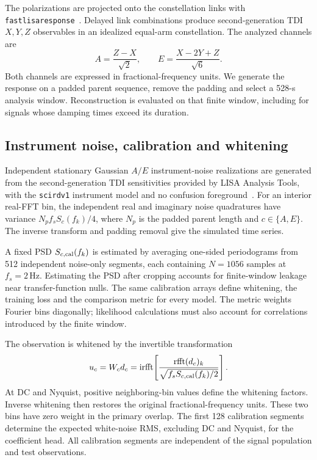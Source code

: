 \documentclass[10pt,prd,aps,a4paper,twocolumn,superscriptaddress,nofootinbib,floatfix]{revtex4-2}
\begin{document}
The polarizations are projected onto the constellation links with \texttt{fastlisaresponse}~\cite{Katz2022Response}. Delayed link combinations produce second-generation TDI $X,Y,Z$ observables in an idealized equal-arm constellation. The analyzed channels are
\begin{equation}
A=\frac{Z-X}{\sqrt{2}},\qquad E=\frac{X-2Y+Z}{\sqrt{6}}.\label{eq:aet_convention}
\end{equation}
Both channels are expressed in fractional-frequency units. We generate the response on a padded parent sequence, remove the padding and select a 528-s analysis window. Reconstruction is evaluated on that finite window, including for signals whose damping times exceed its duration.

\subsection{Instrument noise, calibration and whitening}\label{noise model}
Independent stationary Gaussian $A/E$ instrument-noise realizations are generated from the second-generation TDI sensitivities provided by LISA Analysis Tools, with the \texttt{scirdv1} instrument model and no confusion foreground~\cite{LISAAnalysisTools}. For an interior real-FFT bin, the independent real and imaginary noise quadratures have variance $N_p f_s S_c(f_k)/4$, where $N_p$ is the padded parent length and $c\in\{A,E\}$. The inverse transform and padding removal give the simulated time series.

A fixed PSD $S_{c,\rm cal}(f_k)$ is estimated by averaging one-sided periodograms from 512 independent noise-only segments, each containing $N=1056$ samples at $f_s=2\,\mathrm{Hz}$. Estimating the PSD after cropping accounts for finite-window leakage near transfer-function nulls. The same calibration arrays define whitening, the training loss and the comparison metric for every model. The metric weights Fourier bins diagonally; likelihood calculations must also account for correlations introduced by the finite window.

The observation is whitened by the invertible transformation
\begin{equation}
u_c=W_cd_c=\operatorname{irfft}\!\left[
\frac{\operatorname{rfft}(d_c)_k}{\sqrt{f_sS_{c,\rm cal}(f_k)/2}}\right].\label{eq:whitening}
\end{equation}
At DC and Nyquist, positive neighboring-bin values define the whitening factors. Inverse whitening then restores the original fractional-frequency units. These two bins have zero weight in the primary overlap. The first 128 calibration segments determine the expected white-noise RMS, excluding DC and Nyquist, for the coefficient head. All calibration segments are independent of the signal population and test observations.
\end{document}
